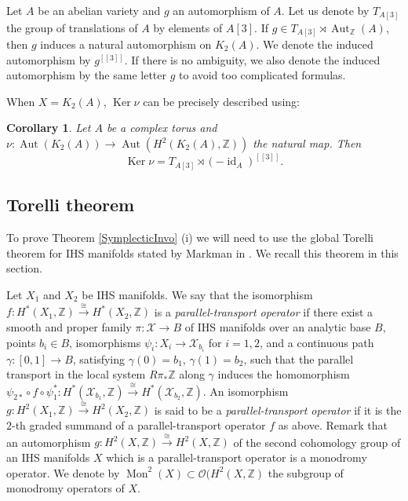 \documentclass{alggeom}
\DeclareMathOperator{\Aut}{Aut}
\DeclareMathOperator{\id}{id}
\DeclareMathOperator{\Ker}{Ker}
\DeclareMathOperator{\Mon}{Mon}
\newcommand{\Z}{\mathbb{Z}}
\theoremstyle{plain}
\newtheorem{cor}[theorem]{Corollary}
\theoremstyle{definition}
\theoremstyle{remark}
\begin{document}
Let $A$ be an abelian variety and $g$ an automorphism of $A$. Let us denote by $T_{A[3]}$ the group of translations of $A$ by elements of $A[3]$. 
If $g\in  T_{A[3]}\rtimes\Aut_{\Z} (A)$, then $g$ induces a natural automorphism on $K_2(A)$. 
We denote the induced automorphism by $g^{[[3]]}$. If there is no ambiguity, we also denote the induced automorphism by the same letter $g$
to avoid too complicated formulas.

When $X=K_2(A)$, $\Ker \nu$ can be precisely described using: 
\begin{cor}\cite[Corollary 3.3]{BNS2}\label{BNS2cor}
 Let $A$ be a complex torus and $\nu: \Aut (K_2(A))\rightarrow \Aut (H^{2}(K_2(A),\Z))$ the natural map.
 Then $$\Ker \nu = T_{A[3]}\rtimes(-\id_A)^{[[3]]}.$$ 
 \end{cor}
\subsection{Torelli theorem}
To prove Theorem \ref{SymplecticInvo} (i) we will need to use the global Torelli theorem for IHS manifolds stated by Markman in \cite{Markmansurvey}. We recall this theorem in this section.

Let $X_1$ and $X_2$ be IHS manifolds. We say that the isomorphism $f: H^*(X_1,\Z) \stackrel{\cong}{\rightarrow} H^*(X_2,\Z)$ is a \emph{parallel-transport operator} if there exist a smooth and proper family $\pi : \mathcal{X}\rightarrow B$ of IHS manifolds over an analytic base $B$, points $b_i\in B$, isomorphisms $\psi_i : X_i \rightarrow \mathcal{X}_{b_i}$ for $i=1,2$, and a continuous path $\gamma: \left[ 0, 1 \right] \rightarrow B$, satisfying $\gamma(0)=b_1$, $\gamma(1)=b_2$, such that the parallel transport in the local system $R\pi_* \Z$ along $\gamma$ induces the homomorphism $\psi_{2*}\circ f\circ \psi_1^{*}: H^*(\mathcal{X}_{b_1},\Z)\stackrel{\cong}{\rightarrow} H^*(\mathcal{X}_{b_2},\Z)$. 
An isomorphism $g: H^{2}(X_1,\Z)\stackrel{\cong}{\rightarrow} H^{2}(X_2,\Z)$ is said to be a \emph{parallel-transport operator} if it is the $2$-th graded summand of a parallel-transport operator $f$ as above. 
Remark that an automorphism $g: H^{2}(X,\Z)\stackrel{\cong}{\rightarrow} H^{2}(X,\Z)$ of the second cohomology group of an IHS manifolds $X$ which is a parallel-transport operator is a monodromy operator. We denote by $\Mon^2(X)\subset \mathcal{O}(H^2(X,\Z)$ the subgroup of monodromy operators of $X$.
\end{document}
